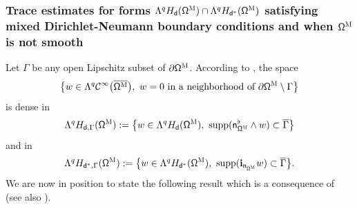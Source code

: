 \documentclass[JEP,XML,SOM,Unicode,NoEqCountersInSection,NoFloatCountersInSection,published]{cedram}
\let\pa\partial
\DeclareMathOperator\supp{supp}
\theoremstyle{plain}
\theoremstyle{definition}
\begin{document}
\subsubsection*{Trace estimates for forms $ \Lambda^q H_{\mathsf d} (\mathsf \Omega^{\textsc{M}})\cap \Lambda^q H_{\mathsf d^*} (\mathsf \Omega^{\textsc{M}})$ satisfying mixed Dirichlet-Neumann boundary conditions and when $\mathsf \Omega^{\textsc{M}}$ is not smooth}
Let $\Gamma$ be any open Lipschitz subset of $\partial \mathsf \Omega^{\textsc{M}}$. According to \cite[Prop.\,3.1]{jakab-mitrea-mitrea-09},
the space
\[
\big \{w\in\Lambda^q\mathcal C^\infty\bigl(\overline{\mathsf \Omega^{\textsc{M}}}\bigr),\
w= 0 \text{ in a neighborhood of } \pa\mathsf \Omega^{\textsc{M}}\setminus \Gamma \big \}
\]
is dense in
\[
\Lambda^q H_{\mathsf d,\Gamma} (\mathsf \Omega^{\textsc{M}}):= \big \{w\in\Lambda^q H_{\mathsf d} (\mathsf \Omega^{\textsc{M}}),\
\supp(\mathsf n_{\mathsf \Omega^{\textsc{M}}}^{\flat} \wedge w)\subset \overline\Gamma \big \}
\]
and in
\[
\Lambda^q H_{\mathsf d^*,\Gamma} (\mathsf \Omega^{\textsc{M}}):= \big \{w\in\Lambda^q H_{\mathsf d^*} (\mathsf \Omega^{\textsc{M}}),\
\supp(\mathbf{i}_{\mathsf n_{\mathsf \Omega^{\textsc{M}}}} w)\subset \overline\Gamma \big \}.
\]
We are now in position to state the following result which is a consequence of \cite[Th.\,1.1 \&~1.2]{jakab-mitrea-mitrea-09} (see also \cite[Th.\,4.1 \&~4.2]{goldshtein-mitrea-mitrea-11}).
\end{document}
